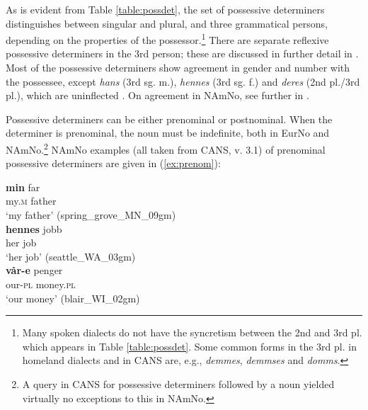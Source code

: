 \documentclass[output=paper,colorlinks,citecolor=brown]{langscibook}
\begin{document}
As is evident from Table \ref{table:possdet}, the set of possessive determiners distinguishes between singular and plural, and three grammatical persons, depending on the properties of the possessor.\footnote{Many spoken dialects do not have the syncretism between the 2nd and 3rd pl. which appears in Table \ref{table:possdet}. Some common forms in the 3rd pl. in homeland dialects and in CANS are, e.g., \emph{demmes}, \emph{demmses} and \emph{domms}.} There are separate reflexive possessive determiners in the 3rd person; these are discussed in further detail in . Most of the possessive determiners  show agreement in gender and number with the possessee, 
except \emph{hans} (3rd sg. m.), \emph{hennes} (3rd sg. f.) and \emph{deres} (2nd pl./3rd pl.),   which are uninflected \citep[31]{faarlund2019syntax}. On agreement in NAmNo, see further in . 


\begin{sloppypar}
Possessive determiners can be either prenominal or postnominal. When the determiner is prenominal, the noun must be indefinite, both in EurNo and NAmNo.\footnote{A query in CANS for possessive determiners followed by a noun yielded virtually no exceptions to this in NAmNo.} NAmNo examples (all taken from CANS, v. 3.1) of prenominal possessive determiners are given in (\ref{ex:prenom}):
\end{sloppypar}

\ea \label{ex:prenom}
\ea \label{ex:minfar} \gll \textbf{min} far \\
    my.\textsc{m} father\\
   \glt  `my father' (spring\_grove\_MN\_09gm)\\
\ex \label{ex:hennesjobb} \gll \textbf{hennes} jobb \\
her job \\
\glt `her job' (seattle\_WA\_03gm)\\   
\ex \label{ex:vårepenger} \gll \textbf{vår-e} penger \\
our-\textsc{pl} money.\textsc{pl} \\
\glt `our money' (blair\_WI\_02gm) \\
\z 
\z 
\end{document}

